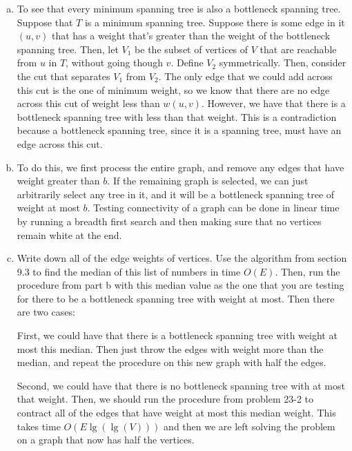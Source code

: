 \documentclass{article}
\begin{document}
\begin{enumerate}[a.]
\item
To see that every minimum spanning tree is also a bottleneck spanning tree. Suppose that $T$ is a minimum spanning tree. Suppose there is some edge in it $(u,v)$ that has a weight that's greater than the weight of the bottleneck spanning tree. Then, let $V_1$ be the subset of vertices of $V$ that are reachable from $u$ in $T$, without going though $v$. Define $V_2$ symmetrically. Then, consider the cut that separates $V_1$ from $V_2$. The only edge that we could add across this cut is the one of minimum weight, so we know that there are no edge across this cut of weight less than $w(u,v)$. However, we have that there is a bottleneck spanning tree with less than that weight. This is a contradiction because a bottleneck spanning tree, since it is a spanning tree, must have an edge across this cut.
\item
To do this, we first process the entire graph, and remove any edges that have weight greater than $b$. If the remaining graph is selected, we can just arbitrarily select any tree in it, and it will be a bottleneck spanning tree of weight at most $b$. Testing connectivity of a graph can be done in linear time by running a breadth first search and then making sure that no vertices remain white at the end.
\item
Write down all of the edge weights of vertices. Use the algorithm from section 9.3 to find the median of this list of numbers in time $O(E)$. Then, run the procedure from part b with this median value as the one that you are testing for there to be a bottleneck spanning tree with weight at most. Then there are two cases:

First, we could have that there is a bottleneck spanning tree with weight at most this median. Then just throw the edges with weight more than the median, and repeat the procedure on this new graph with half the edges.

Second, we could have that there is no bottleneck spanning tree with at most that weight. Then, we should run the procedure from problem 23-2 to contract all of the edges that have weight at most this median weight. This takes time $O(E\lg(\lg(V)))$ and then we are left solving the problem on a graph that now has half the vertices.
\end{enumerate}
\end{document}
